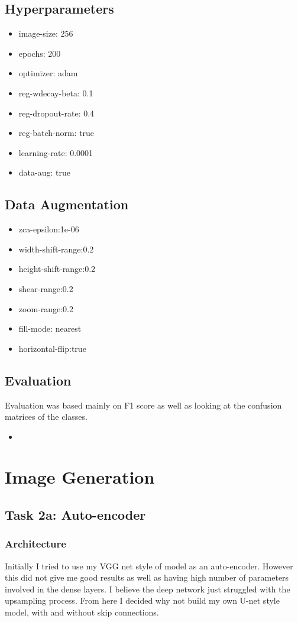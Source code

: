 \documentclass[12pt]{article}
\begin{document}
\subsection{Hyperparameters}
\begin{itemize}
    \item image-size: 256
    \item epochs: 200
    \item optimizer: adam
    \item reg-wdecay-beta: 0.1
    \item reg-dropout-rate: 0.4
    \item reg-batch-norm: true
    \item learning-rate: 0.0001
    \item data-aug: true
\end{itemize}

\subsection{Data Augmentation}
\begin{itemize}
    \item  zca-epsilon:1e-06
    \item  width-shift-range:0.2
    \item  height-shift-range:0.2
    \item  shear-range:0.2
    \item  zoom-range:0.2
    \item  fill-mode: nearest
    \item  horizontal-flip:true
\end{itemize}
\subsection{Evaluation}

Evaluation was based mainly on F1 score as well as looking at the confusion matrices of the classes. 
\begin{itemize}
    \item 
\end{itemize}


\section{Image Generation }
\subsection{Task 2a: Auto-encoder}
\subsubsection{Architecture}
Initially I tried to use my VGG net style of model as an auto-encoder. However this did not give me good results as well as having high number of parameters
involved in the dense layers. I believe the deep network just struggled with the upsampling process.
From here I decided why not build my own U-net style model, with and without skip connections. 
\end{document}
